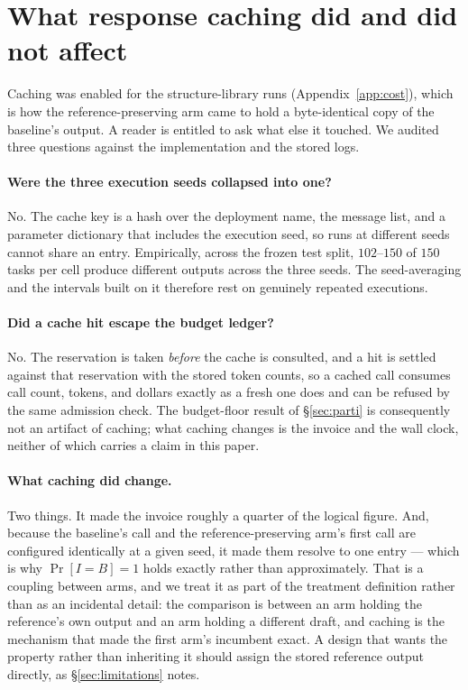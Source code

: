 \documentclass{article}
\begin{document}
\section{What response caching did and did not affect}
\label{app:cacheaudit}

Caching was enabled for the structure-library runs (Appendix~\ref{app:cost}),
which is how the reference-preserving arm came to hold a byte-identical copy of
the baseline's output. A reader is entitled to ask what else it touched. We
audited three questions against the implementation and the stored logs.

\paragraph{Were the three execution seeds collapsed into one?} No. The cache key
is a hash over the deployment name, the message list, and a parameter dictionary
that includes the execution seed, so runs at different seeds cannot share an
entry. Empirically, across the frozen test split, $102$--$150$ of $150$ tasks
per cell produce different outputs across the three seeds. The seed-averaging
and the intervals built on it therefore rest on genuinely repeated executions.

\paragraph{Did a cache hit escape the budget ledger?} No. The reservation is
taken \emph{before} the cache is consulted, and a hit is settled against that
reservation with the stored token counts, so a cached call consumes call count,
tokens, and dollars exactly as a fresh one does and can be refused by the same
admission check. The budget-floor result of \S\ref{sec:parti} is consequently
not an artifact of caching; what caching changes is the invoice and the wall
clock, neither of which carries a claim in this paper.

\paragraph{What caching did change.} Two things. It made the invoice roughly a
quarter of the logical figure. And, because the baseline's call and the
reference-preserving arm's first call are configured identically at a given
seed, it made them resolve to one entry --- which is why $\Pr[I{=}B]=1$ holds
exactly rather than approximately. That is a coupling between arms, and we
treat it as part of the treatment definition rather than as an incidental
detail: the comparison is between an arm holding the reference's own output and
an arm holding a different draft, and caching is the mechanism that made the
first arm's incumbent exact. A design that wants the property rather than
inheriting it should assign the stored reference output directly, as
\S\ref{sec:limitations} notes.
\end{document}
